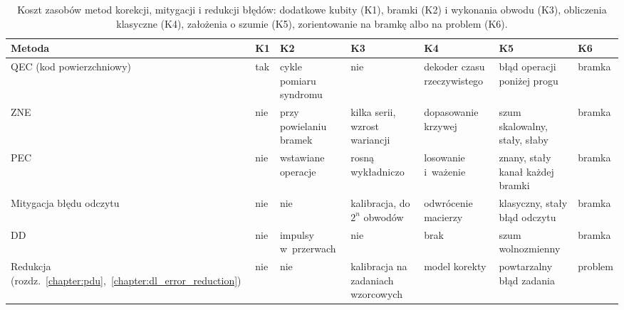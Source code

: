 \begin{table}[htb]
  \centering
  \caption[Koszt zasobów metod korekcji, mitygacji i redukcji błędów]{Koszt zasobów metod korekcji, mitygacji i redukcji błędów: dodatkowe kubity (K1), bramki (K2) i wykonania obwodu (K3), obliczenia klasyczne (K4), założenia o szumie (K5), zorientowanie na bramkę albo na problem (K6).}
  \label{tab:tb03:cost}
  \footnotesize
  \setlength{\tabcolsep}{3pt}
  \newcommand{\tbc}[1]{\raggedright\hspace{0pt}#1}
  \begin{tabular}{@{}p{2.5cm}p{0.6cm}p{2.3cm}p{2.5cm}p{2.3cm}p{2.95cm}p{1.45cm}@{}}
    \toprule
    \tbc{\textbf{Metoda}} & \tbc{\textbf{K1}} & \tbc{\textbf{K2}} & \tbc{\textbf{K3}} & \tbc{\textbf{K4}} & \tbc{\textbf{K5}} & \tbc{\textbf{K6}} \tabularnewline
    \midrule
    \tbc{QEC (kod powierzchniowy)} & \tbc{tak} & \tbc{cykle pomiaru syndromu} & \tbc{nie} & \tbc{dekoder czasu rzeczywistego} & \tbc{błąd operacji poniżej progu} & \tbc{bramka} \tabularnewline
    \tbc{ZNE} & \tbc{nie} & \tbc{przy powielaniu bramek} & \tbc{kilka serii, wzrost wariancji} & \tbc{dopasowanie krzywej} & \tbc{szum skalowalny, stały, słaby} & \tbc{bramka} \tabularnewline
    \tbc{PEC} & \tbc{nie} & \tbc{wstawiane operacje} & \tbc{rosną wykładniczo} & \tbc{losowanie i~ważenie} & \tbc{znany, stały kanał każdej bramki} & \tbc{bramka} \tabularnewline
    \tbc{Mitygacja błędu odczytu} & \tbc{nie} & \tbc{nie} & \tbc{kalibracja, do $2^n$ obwodów} & \tbc{odwrócenie macierzy} & \tbc{klasyczny, stały błąd odczytu} & \tbc{bramka} \tabularnewline
    \tbc{DD} & \tbc{nie} & \tbc{impulsy w~przerwach} & \tbc{nie} & \tbc{brak} & \tbc{szum wolnozmienny} & \tbc{bramka} \tabularnewline
    \tbc{Redukcja (rozdz.~\ref{chapter:pdu},~\ref{chapter:dl_error_reduction})} & \tbc{nie} & \tbc{nie} & \tbc{kalibracja na zadaniach wzorcowych} & \tbc{model korekty} & \tbc{powtarzalny błąd zadania} & \tbc{problem} \tabularnewline
    \bottomrule
  \end{tabular}
\end{table}
